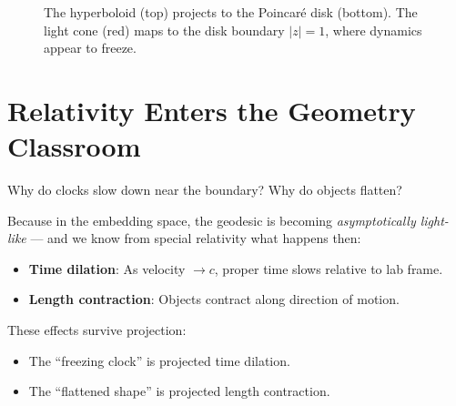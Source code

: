 \documentclass[10pt]{article}
\begin{document}
\begin{figure}[H]
\centering
{}
\caption{The hyperboloid (top) projects to the Poincaré disk (bottom). The light cone (red) maps to the disk boundary $|z| = 1$, where dynamics appear to freeze.}
\label{fig:projection}
\end{figure}

\section*{Relativity Enters the Geometry Classroom}

Why do clocks slow down near the boundary? Why do objects flatten?

Because in the embedding space, the geodesic is becoming \emph{asymptotically light-like} --- and we know from special relativity what happens then:

\begin{itemize}
\item \textbf{Time dilation}: As velocity $\to c$, proper time slows relative to lab frame.
\item \textbf{Length contraction}: Objects contract along direction of motion.
\end{itemize}

These effects survive projection:

\begin{itemize}
\item The ``freezing clock'' is projected time dilation.
\item The ``flattened shape'' is projected length contraction.
\end{itemize}
\end{document}
